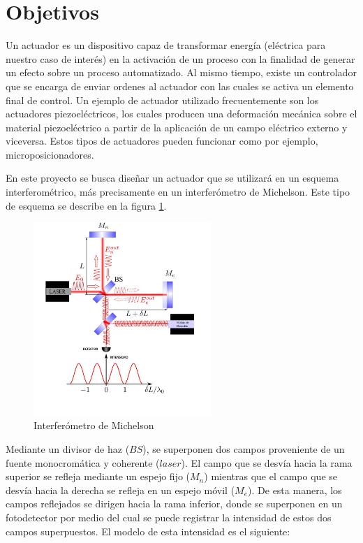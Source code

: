 \section{Objetivos}
\label{sec:objetivos}
Un actuador es un dispositivo capaz de transformar energía (eléctrica para nuestro caso de interés) en la activación de un proceso con la finalidad de generar un efecto sobre un proceso automatizado. Al mismo tiempo, existe un controlador que se encarga de enviar ordenes al actuador con las cuales se activa un elemento final de control. Un ejemplo de actuador utilizado frecuentemente son los actuadores piezoeléctricos, los cuales producen una deformación mecánica sobre el material piezoeléctrico a partir de la aplicación de un campo eléctrico externo y viceversa. Estos tipos de actuadores pueden funcionar como por ejemplo, microposicionadores.

En este proyecto se busca diseñar un actuador que se utilizará en un esquema interferométrico, más precisamente en un interferómetro de Michelson. Este tipo de esquema se describe en la figura \ref{fig:interferometro}.

\begin{figure}[H]
  \centering
  \includegraphics[width=0.6\textwidth]{images/interfer_metro+modulo_deteccion.png}
  \caption{Interferómetro de Michelson}
  \label{fig:interferometro}
\end{figure}


Mediante un divisor de haz ($BS$), se superponen dos campos proveniente de un fuente monocromática y coherente ($laser$). El campo que se desvía hacia la rama superior se refleja mediante un espejo fijo ($M_n$) mientras que el campo que se desvía hacia la derecha se refleja en un espejo móvil ($M_e$). De esta manera, los campos reflejados se dirigen hacia la rama inferior, donde se superponen en un fotodetector por medio del cual se puede registrar la intensidad de estos dos campos superpuestos. El modelo de esta intensidad es el siguiente:

